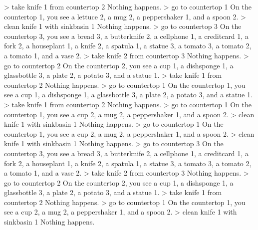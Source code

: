 \documentclass[
]{article}
\newenvironment{Shaded}{}{}
\newcommand{\NormalTok}[1]{#1}
\begin{document}
\begin{Shaded}
\begin{Highlighting}[]
\NormalTok{\textgreater{} take knife 1 from countertop 2}
\NormalTok{Nothing happens.}
\NormalTok{\textgreater{} go to countertop 1}
\NormalTok{On the countertop 1, you see a lettuce 2, a mug 2, a peppershaker 1, and a spoon 2.}
\NormalTok{\textgreater{} clean knife 1 with sinkbasin 1}
\NormalTok{Nothing happens.}
\NormalTok{\textgreater{} go to countertop 3}
\NormalTok{On the countertop 3, you see a bread 3, a butterknife 2, a cellphone 1, a creditcard 1, a fork 2, a houseplant 1, a knife 2, a spatula 1, a statue 3, a tomato 3, a tomato 2, a tomato 1, and a vase 2.}
\NormalTok{\textgreater{} take knife 2 from countertop 3}
\NormalTok{Nothing happens.}
\NormalTok{\textgreater{} go to countertop 2}
\NormalTok{On the countertop 2, you see a cup 1, a dishsponge 1, a glassbottle 3, a plate 2, a potato 3, and a statue 1.}
\NormalTok{\textgreater{} take knife 1 from countertop 2}
\NormalTok{Nothing happens.}
\NormalTok{\textgreater{} go to countertop 1}
\NormalTok{On the countertop 1, you see a cup 1, a dishsponge 1, a glassbottle 3, a plate 2, a potato 3, and a statue 1.}
\NormalTok{\textgreater{} take knife 1 from countertop 2}
\NormalTok{Nothing happens.}
\NormalTok{\textgreater{} go to countertop 1}
\NormalTok{On the countertop 1, you see a cup 2, a mug 2, a peppershaker 1, and a spoon 2.}
\NormalTok{\textgreater{} clean knife 1 with sinkbasin 1}
\NormalTok{Nothing happens.}
\NormalTok{\textgreater{} go to countertop 1}
\NormalTok{On the countertop 1, you see a cup 2, a mug 2, a peppershaker 1, and a spoon 2.}
\NormalTok{\textgreater{} clean knife 1 with sinkbasin 1}
\NormalTok{Nothing happens.}
\NormalTok{\textgreater{} go to countertop 3}
\NormalTok{On the countertop 3, you see a bread 3, a butterknife 2, a cellphone 1, a creditcard 1, a fork 2, a houseplant 1, a knife 2, a spatula 1, a statue 3, a tomato 3, a tomato 2, a tomato 1, and a vase 2.}
\NormalTok{\textgreater{} take knife 2 from countertop 3}
\NormalTok{Nothing happens.}
\NormalTok{\textgreater{} go to countertop 2}
\NormalTok{On the countertop 2, you see a cup 1, a dishsponge 1, a glassbottle 3, a plate 2, a potato 3, and a statue 1.}
\NormalTok{\textgreater{} take knife 1 from countertop 2}
\NormalTok{Nothing happens.}
\NormalTok{\textgreater{} go to countertop 1}
\NormalTok{On the countertop 1, you see a cup 2, a mug 2, a peppershaker 1, and a spoon 2.}
\NormalTok{\textgreater{} clean knife 1 with sinkbasin 1}
\NormalTok{Nothing happens. }
\end{Highlighting}
\end{Shaded}
\end{document}
